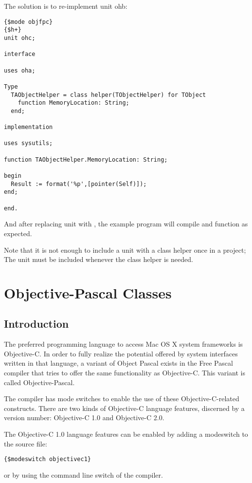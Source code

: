 The solution is to re-implement unit ohb:
\begin{verbatim}
{$mode objfpc}
{$h+}
unit ohc;

interface

uses oha;

Type
  TAObjectHelper = class helper(TObjectHelper) for TObject
    function MemoryLocation: String;
  end;

implementation

uses sysutils;

function TAObjectHelper.MemoryLocation: String;

begin
  Result := format('%p',[pointer(Self)]);
end;

end.
\end{verbatim}
And after replacing unit  with , the example program will
compile and function as expected.

Note that it is not enough to include a unit with a class helper once in a
project; The unit must be included whenever the class helper is needed.


\chapter{Objective-Pascal Classes}
\label{ch:ObjectivePascal}


\section{Introduction}
The preferred programming language to access Mac OS X system frameworks is
Objective-C. In order to fully realize the potential offered by system
interfaces written in that language, a variant of Object Pascal
exists in the Free Pascal compiler that tries to offer the same
functionality as Objective-C. This variant is called Objective-Pascal.

The compiler has mode switches to enable the use of these Objective-C-related
constructs. There are two kinds of Objective-C language features, discerned by
a version number: Objective-C 1.0 and Objective-C 2.0.

The Objective-C 1.0 language features can be enabled by adding a modeswitch
to the source file:
\begin{verbatim}
{$modeswitch objectivec1}
\end{verbatim}
or by using the  command line switch of the compiler.

